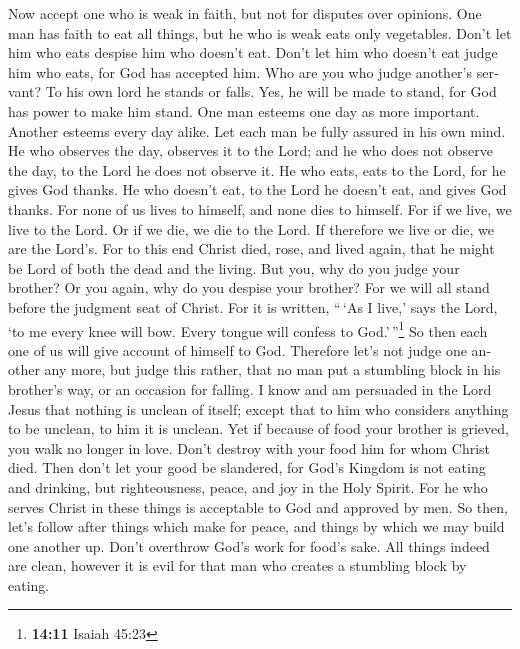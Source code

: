 \begin{paracol}{2}
\begin{otherlanguage}{english}
 Now accept one who is weak in faith, but not for disputes
over opinions.  One man has faith to eat all things, but
he who is weak eats only vegetables.  Don't let him who
eats despise him who doesn't eat. Don't let him who doesn't eat judge
him who eats, for God has accepted him.  Who are you who
judge another's servant? To his own lord he stands or falls. Yes, he
will be made to stand, for God has power to make him stand.
 One man esteems one day as more important. Another
esteems every day alike. Let each man be fully assured in his own mind.
 He who observes the day, observes it to the Lord; and he
who does not observe the day, to the Lord he does not observe it. He who
eats, eats to the Lord, for he gives God thanks. He who doesn't eat, to
the Lord he doesn't eat, and gives God thanks.  For none
of us lives to himself, and none dies to himself.  For if
we live, we live to the Lord. Or if we die, we die to the Lord. If
therefore we live or die, we are the Lord's.  For to this
end Christ died, rose, and lived again, that he might be Lord of both
the dead and the living.  But you, why do you judge your
brother? Or you again, why do you despise your brother? For we will all
stand before the judgment seat of Christ.  For it is
written, ``\,`As I live,' says the Lord, `to me every knee will bow.
Every tongue will confess to God.'\,''\footnote{\textbf{14:11} Isaiah
  45:23}  So then each one of us will give account of
himself to God.  Therefore let's not judge one another
any more, but judge this rather, that no man put a stumbling block in
his brother's way, or an occasion for falling.  I know
and am persuaded in the Lord Jesus that nothing is unclean of itself;
except that to him who considers anything to be unclean, to him it is
unclean.  Yet if because of food your brother is grieved,
you walk no longer in love. Don't destroy with your food him for whom
Christ died.  Then don't let your good be slandered,
 for God's Kingdom is not eating and drinking, but
righteousness, peace, and joy in the Holy Spirit.  For he
who serves Christ in these things is acceptable to God and approved by
men.  So then, let's follow after things which make for
peace, and things by which we may build one another up. 
Don't overthrow God's work for food's sake. All things indeed are clean,
however it is evil for that man who creates a stumbling block by eating.

\end{otherlanguage}
\end{paracol}
